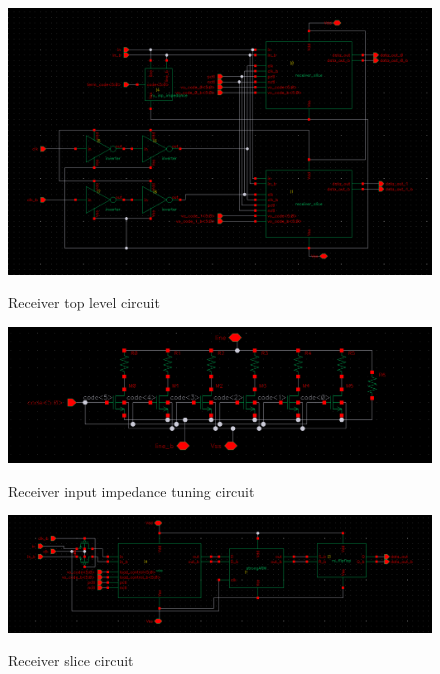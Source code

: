 \begin{figure}[H]
  \centering
  {\includegraphics[scale=0.5]{schematics/receiver.png}}
  \caption{Receiver top level circuit}
  \label{fig:top_level}
\end{figure}

\begin{figure}[H]
  \centering
  {\includegraphics[scale=0.4]{schematics/rx_inp_impedance.png}}
  \caption{Receiver input impedance tuning circuit}
  \label{fig:imp_tuning}
\end{figure}

\begin{figure}[H]
  \centering
  {\includegraphics[scale=0.4]{schematics/receiver_slice.png}}
  \caption{Receiver slice circuit}
  \label{fig:receiver_slice}
\end{figure}


